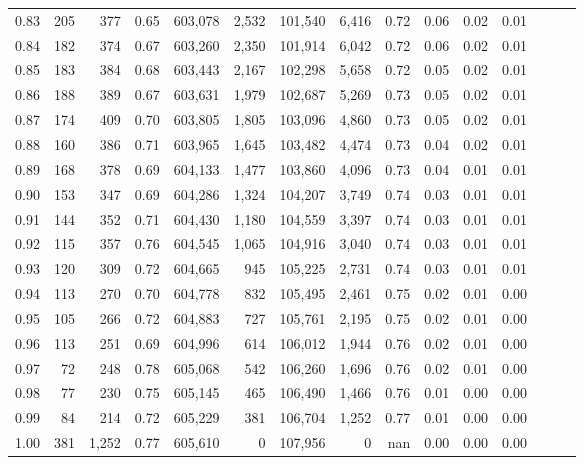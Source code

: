 \begin{tabular}{rrrrrrrrrrrrrrr}
0.83 &     205 &    377 &  0.65 &  603,078 &    2,532 &  101,540 &    6,416 &  0.72 &  0.06 &  0.02 &      0.01 \\
0.84 &     182 &    374 &  0.67 &  603,260 &    2,350 &  101,914 &    6,042 &  0.72 &  0.06 &  0.02 &      0.01 \\
0.85 &     183 &    384 &  0.68 &  603,443 &    2,167 &  102,298 &    5,658 &  0.72 &  0.05 &  0.02 &      0.01 \\
0.86 &     188 &    389 &  0.67 &  603,631 &    1,979 &  102,687 &    5,269 &  0.73 &  0.05 &  0.02 &      0.01 \\
0.87 &     174 &    409 &  0.70 &  603,805 &    1,805 &  103,096 &    4,860 &  0.73 &  0.05 &  0.02 &      0.01 \\
0.88 &     160 &    386 &  0.71 &  603,965 &    1,645 &  103,482 &    4,474 &  0.73 &  0.04 &  0.02 &      0.01 \\
0.89 &     168 &    378 &  0.69 &  604,133 &    1,477 &  103,860 &    4,096 &  0.73 &  0.04 &  0.01 &      0.01 \\
0.90 &     153 &    347 &  0.69 &  604,286 &    1,324 &  104,207 &    3,749 &  0.74 &  0.03 &  0.01 &      0.01 \\
0.91 &     144 &    352 &  0.71 &  604,430 &    1,180 &  104,559 &    3,397 &  0.74 &  0.03 &  0.01 &      0.01 \\
0.92 &     115 &    357 &  0.76 &  604,545 &    1,065 &  104,916 &    3,040 &  0.74 &  0.03 &  0.01 &      0.01 \\
0.93 &     120 &    309 &  0.72 &  604,665 &      945 &  105,225 &    2,731 &  0.74 &  0.03 &  0.01 &      0.01 \\
0.94 &     113 &    270 &  0.70 &  604,778 &      832 &  105,495 &    2,461 &  0.75 &  0.02 &  0.01 &      0.00 \\
0.95 &     105 &    266 &  0.72 &  604,883 &      727 &  105,761 &    2,195 &  0.75 &  0.02 &  0.01 &      0.00 \\
0.96 &     113 &    251 &  0.69 &  604,996 &      614 &  106,012 &    1,944 &  0.76 &  0.02 &  0.01 &      0.00 \\
0.97 &      72 &    248 &  0.78 &  605,068 &      542 &  106,260 &    1,696 &  0.76 &  0.02 &  0.01 &      0.00 \\
0.98 &      77 &    230 &  0.75 &  605,145 &      465 &  106,490 &    1,466 &  0.76 &  0.01 &  0.00 &      0.00 \\
0.99 &      84 &    214 &  0.72 &  605,229 &      381 &  106,704 &    1,252 &  0.77 &  0.01 &  0.00 &      0.00 \\
1.00 &     381 &  1,252 &  0.77 &  605,610 &        0 &  107,956 &        0 &   nan &  0.00 &  0.00 &      0.00 \\
\bottomrule
\end{tabular}
